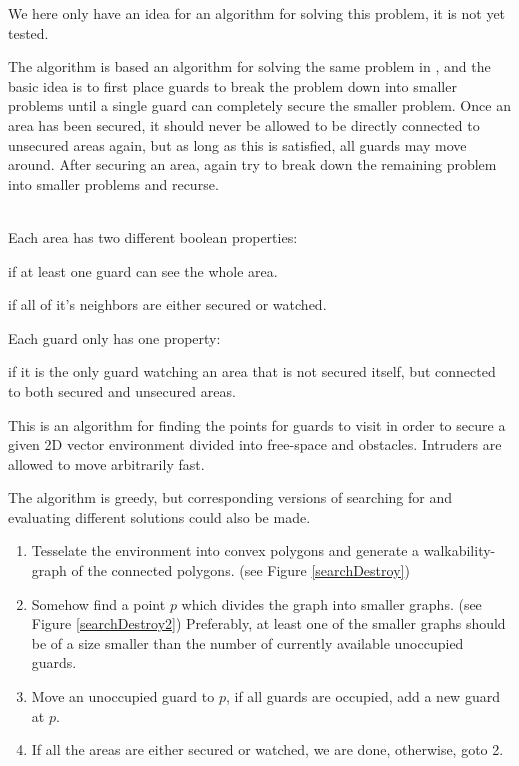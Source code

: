 We here only have an idea for an algorithm for solving this problem, it is not yet tested.

The algorithm is based an algorithm for solving the same problem in \cite{multiSearchSecure}, and the basic idea is to first place guards to break the problem down into smaller problems until a single guard can completely secure the smaller problem.
Once an area has been secured, it should never be allowed to be directly connected to unsecured areas again, but as long as this is satisfied, all guards may move around.
After securing an area, again try to break down the remaining problem into smaller problems and recurse.

\ \\
Each area has two different boolean properties:
\begin{definition}[Watched]
if at least one guard can see the whole area.
\end{definition}
\begin{definition}[Secured]
if all of it's neighbors are either secured or watched.
\end{definition}

Each guard only has one property:
\begin{definition}[Occupied]
if it is the only guard watching an area that is not secured itself, but connected to both secured and unsecured areas.
\end{definition}

\begin{algorithm}
This is an algorithm for finding the points for guards to visit in order to secure a given 2D vector environment divided into free-space and obstacles. Intruders are allowed to move arbitrarily fast.

The algorithm is greedy, but corresponding versions of searching for and evaluating different solutions could also be made.
\begin{enumerate}
	\item Tesselate the environment into convex polygons and generate a walkability-graph of the connected polygons. (see Figure \ref{searchDestroy})
	\item Somehow find a point $p$ which divides the graph into smaller graphs. (see Figure \ref{searchDestroy2})
			Preferably, at least one of the smaller graphs should be of a size smaller than the number of currently available unoccupied guards.
	\item Move an unoccupied guard to $p$, if all guards are occupied, add a new guard at $p$.
	\item If all the areas are either secured or watched, we are done, otherwise, goto 2.
\end{enumerate}
\label{algSearchDestroyIdea}
\end{algorithm}

